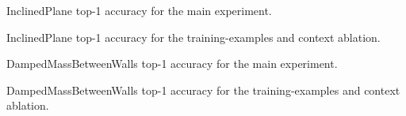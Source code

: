\begin{table}[p]
\centering
\caption{InclinedPlane top-1 accuracy for the main experiment.}
\label{tab:app-inclinedplane-acc-main-experiment}

\end{table}

\begin{table}[p]
\centering
\caption{InclinedPlane top-1 accuracy for the training-examples and context ablation.}
\label{tab:app-inclinedplane-acc-ablation-training-examples}

\end{table}

\begin{table}[p]
\centering
\caption{DampedMassBetweenWalls top-1 accuracy for the main experiment.}
\label{tab:app-dampedmassbetweenwalls-acc-main-experiment}

\end{table}

\begin{table}[p]
\centering
\caption{DampedMassBetweenWalls top-1 accuracy for the training-examples and context ablation.}
\label{tab:app-dampedmassbetweenwalls-acc-ablation-training-examples}

\end{table}
